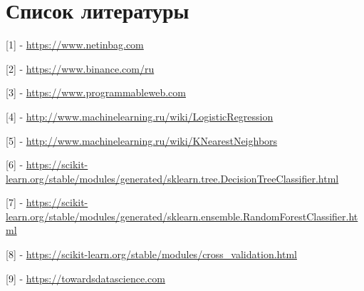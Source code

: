 \documentclass{article}
\begin{document}
	\section{Список литературы}
	[1] - \href{https://www.netinbag.com/ru/finance/what-is-market-arbitrage.html}{https://www.netinbag.com}
	
	[2] - \href{https://www.binance.com/ru}{https://www.binance.com/ru}
	
	[3] - \href{https://www.programmableweb.com/glossary/api}{https://www.programmableweb.com}
	
	[4] - \href{http://www.machinelearning.ru/wiki/index.php?title=%D0%9B%D0%BE%D0%B3%D0%B8%D1%81%D1%82%D0%B8%D1%87%D0%B5%D1%81%D0%BA%D0%B0%D1%8F_%D1%80%D0%B5%D0%B3%D1%80%D0%B5%D1%81%D1%81%D0%B8%D1%8F}{http://www.machinelearning.ru/wiki/LogisticRegression}
	
	[5] - \href{http://www.machinelearning.ru/wiki/index.php?title=%D0%9C%D0%B5%D1%82%D0%BE%D0%B4_%D0%B1%D0%BB%D0%B8%D0%B6%D0%B0%D0%B9%D1%88%D0%B5%D0%B3%D0%BE_%D1%81%D0%BE%D1%81%D0%B5%D0%B4%D0%B0#:~:text=%D0%9C%D0%B0%D1%82%D0%B5%D1%80%D0%B8%D0%B0%D0%BB%20%D0%B8%D0%B7%20MachineLearning.&text=%D0%9C%D0%B5%D1%82%D0%BE%D0%B4%20%D0%B1%D0%BB%D0%B8%D0%B6%D0%B0%D0%B9%D1%88%D0%B8%D1%85%20%D1%81%D0%BE%D1%81%D0%B5%D0%B4%D0%B5%D0%B9%20%E2%80%94%20%D0%BF%D1%80%D0%BE%D1%81%D1%82%D0%B5%D0%B9%D1%88%D0%B8%D0%B9%20%D0%BC%D0%B5%D1%82%D1%80%D0%B8%D1%87%D0%B5%D1%81%D0%BA%D0%B8%D0%B9,%D0%BA%20%D0%BD%D0%B5%D0%BC%D1%83%20%D0%BE%D0%B1%D1%8A%D0%B5%D0%BA%D1%82%D1%8B%20%D0%BE%D0%B1%D1%83%D1%87%D0%B0%D1%8E%D1%89%D0%B5%D0%B9%20%D0%B2%D1%8B%D0%B1%D0%BE%D1%80%D0%BA%D0%B8.}{http://www.machinelearning.ru/wiki/KNearestNeighbors}
	
	[6] - \href{https://scikit-learn.org/stable/modules/generated/sklearn.tree.DecisionTreeClassifier.html}{https://scikit-learn.org/stable/modules/generated/sklearn.tree.DecisionTreeClassifier.html}
	
	[7] - \href{https://scikit-learn.org/stable/modules/generated/sklearn.ensemble.RandomForestClassifier.html}{https://scikit-learn.org/stable/modules/generated/sklearn.ensemble.RandomForestClassifier.html}
	
	[8] - \href{https://scikit-learn.org/stable/modules/cross_validation.html}{https://scikit-learn.org/stable/modules/cross\_validation.html}
	
	[9] - \href{https://towardsdatascience.com/a-look-at-precision-recall-and-f1-score-36b5fd0dd3ec#:~:text=F1%2Dscore%20when%20Precision%3D0.8%20and%20Recall%20%3D%200.01%20to%201.0&text=Here%20precision%20is%20fixed%20at,varies%20from%200.0%20to%201.0.}{https://towardsdatascience.com}
	
\end{document}
